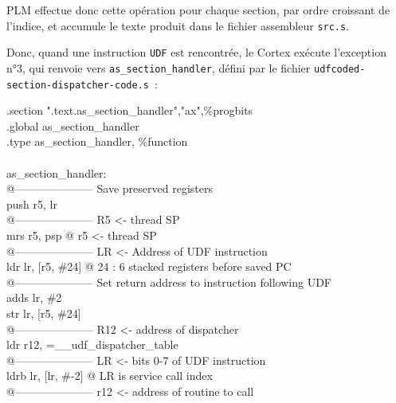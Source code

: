PLM effectue donc cette opération pour chaque section, par ordre croissant de l'indice, et accumule le texte produit dans le fichier assembleur \texttt{src.s}.

Donc, quand une instruction \texttt{UDF} est rencontrée, le Cortex exécute l'exception n°3, qui renvoie vers \texttt{as\_section\_handler}, défini par le fichier \texttt{udfcoded-section-dispatcher-code.s}~:

\begin{SHELL}\small
\hspace*{1.2em}.section	".text.as\_section\_handler","ax",\%progbits\\
\hspace*{1.2em}.global as\_section\_handler\\
\hspace*{1.2em}.type as\_section\_handler, \%function\\
\\
as\_section\_handler:\\
@--------------------- Save preserved registers\\
\hspace*{1.2em}push  {r5, lr}\\
@--------------------- R5 <- thread SP\\
\hspace*{1.2em}mrs   r5, psp           @ r5 <- thread SP\\
@--------------------- LR <- Address of UDF instruction\\
\hspace*{1.2em}ldr   lr, [r5, \#24]     @ 24 : 6 stacked registers before saved PC\\
@--------------------- Set return address to instruction following UDF\\
\hspace*{1.2em}adds  lr, \#2\\
\hspace*{1.2em}str   lr, [r5, \#24]\\
@--------------------- R12 <- address of dispatcher\\
\hspace*{1.2em}ldr   r12, =\_\_udf\_dispatcher\_table\\
@--------------------- LR <- bits 0-7 of UDF instruction\\
\hspace*{1.2em}ldrb  lr, [lr, \#-2]            @ LR is service call index\\
@--------------------- r12 <- address of routine to call\\

\end{SHELL}
